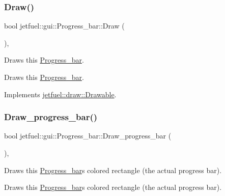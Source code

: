 \subsubsection{\texorpdfstring{Draw()}{Draw()}}
{\footnotesize\ttfamily bool jetfuel\+::gui\+::\+Progress\+\_\+bar\+::\+Draw (\begin{DoxyParamCaption}{ }\end{DoxyParamCaption})\hspace{0.3cm}{\ttfamily [override]}, {\ttfamily [virtual]}}



Draws this \hyperlink{classjetfuel_1_1gui_1_1Progress__bar}{Progress\+\_\+bar}. 

Draws this \hyperlink{classjetfuel_1_1gui_1_1Progress__bar}{Progress\+\_\+bar}. 

Implements \hyperlink{classjetfuel_1_1draw_1_1Drawable_a1a072070322965ce9411ee6e7c311c56}{jetfuel\+::draw\+::\+Drawable}.

\mbox{\label{classjetfuel_1_1gui_1_1Progress__bar_ad27c8ac735ad8698fce255b642cc6944}} 
\subsubsection{\texorpdfstring{Draw\+\_\+progress\+\_\+bar()}{Draw\_progress\_bar()}}
{\footnotesize\ttfamily bool jetfuel\+::gui\+::\+Progress\+\_\+bar\+::\+Draw\+\_\+progress\+\_\+bar (\begin{DoxyParamCaption}{ }\end{DoxyParamCaption})\hspace{0.3cm}{\ttfamily [inline]}, {\ttfamily [protected]}}



Draws this \hyperlink{classjetfuel_1_1gui_1_1Progress__bar}{Progress\+\_\+bar}\textquotesingle{}s colored rectangle (the actual progress bar). 

Draws this \hyperlink{classjetfuel_1_1gui_1_1Progress__bar}{Progress\+\_\+bar}\textquotesingle{}s colored rectangle (the actual progress bar). \mbox{\label{classjetfuel_1_1gui_1_1Progress__bar_a97bc9fab7b77a271db47f91c95af8672}} 
